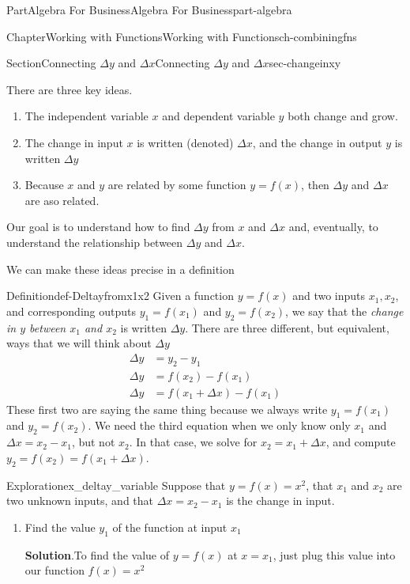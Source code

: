 \documentclass{tufte-book}
\newcommand{\blocktitlefont}{\relax}
\numberwithin{equation}{chapter}
\newcommand{\amp}{&}
\begin{document}
\begin{partptx}{Part}{Algebra For Business}{}{Algebra For Business}{}{}{part-algebra}
\begin{chapterptx}{Chapter}{Working with Functions}{}{Working with Functions}{}{}{ch-combiningfns}
\begin{sectionptx}{Section}{\textasteriskcentered{}Connecting \(\Delta y\) and \(\Delta x\)}{}{\textasteriskcentered{}Connecting \(\Delta y\) and \(\Delta x\)}{}{}{sec-changeinxy}
\par
There are three key ideas.%
\begin{enumerate}
\item{}The independent variable \(x\) and dependent variable \(y\) both change and grow.%
\item{}The change in input \(x\) is written (denoted) \(\Delta x\), and the change in output \(y\) is written \(\Delta y\)%
\item{}Because \(x\) and \(y\) are related by some function \(y=f(x)\), then \(\Delta y\) and \(\Delta x\) are aso related.%
\end{enumerate}
Our goal is to understand how to find \(\Delta y\) from \(x\) and \(\Delta x\) and, eventually, to understand the relationship between \(\Delta y\) and \(\Delta x\).%
\par
We can make these ideas precise in a definition%
\begin{definition}{Definition}{}{def-Deltayfromx1x2}%
Given a function \(y=f(x)\) and two inputs \(x_1,x_2\), and corresponding outputs \(y_1 = f(x_1)\) and \(y_2=f(x_2)\), we say that the \emph{change in \(y\) between \(x_1\) and \(x_2\)} is written \(\Delta y\). There are three different, but equivalent, ways that we will think about \(\Delta y\)%
\begin{align}
\Delta y \amp = y_2 - y_1 \label{def-Deltayfromx1x2-1-1-8-1}\\
\Delta y \amp = f(x_2) - f(x_1)\label{def-Deltayfromx1x2-1-1-8-2}\\
\Delta y \amp = f(x_1 + \Delta x) - f(x_1)\label{def-Deltayfromx1x2-1-1-8-3}
\end{align}
These first two are saying the same thing because we always write \(y_1 = f(x_1)\) and \(y_2=f(x_2)\). We need the third equation when we only know only \(x_1\) and \(\Delta x = x_2-x_1\), but not \(x_2\).  In that case, we solve for \(x_2 = x_1 + \Delta x\), and compute \(y_2 = f(x_2) = f(x_1+\Delta x)\).%
\end{definition}
\begin{exploration}{Exploration}{}{ex_deltay_variable}%
Suppose that \(y = f(x) = x^2\), that \(x_1\) and \(x_2\) are two unknown inputs, and that \(\Delta x = x_2-x_1\) is the change in input.%
\begin{enumerate}[font=\bfseries,label=(\alph*),ref=\alph*]%
\item{}Find the value \(y_1\) of the function at input \(x_1\)%
\par\smallskip%
\noindent\textbf{\blocktitlefont Solution}.\hypertarget{ex_deltay_variable-2-2}{}\quad{}To find the value of \(y=f(x)\) at \(x=x_1\), just plug this value into our function \(f(x)=x^2\)%

\end{enumerate}
\end{exploration}
\end{sectionptx}
\end{chapterptx}
\end{partptx}
\end{document}
